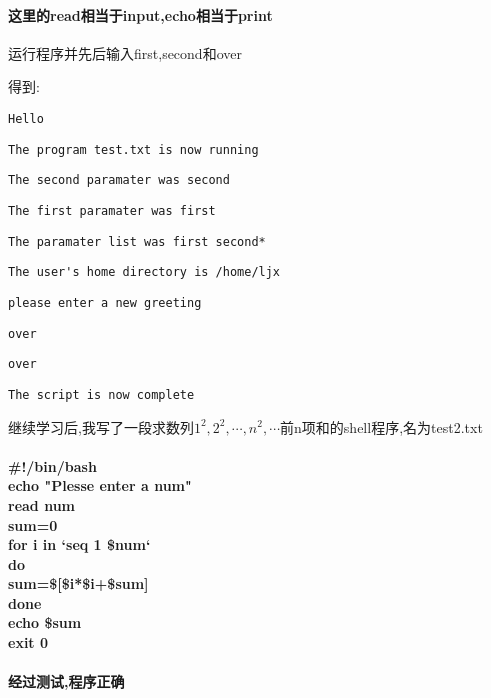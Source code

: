 \documentclass{ctexart}
\begin{document}
\paragraph{这里的read相当于input,echo相当于print}
运行程序并先后输入first,second和over\par
得到:\par
\verb|Hello|\par 
\verb|The program test.txt is now running|\par 
\verb|The second paramater was second|\par 
\verb|The first paramater was first|\par
\verb|The paramater list was first second*|\par 
\verb|The user's home directory is /home/ljx|\par 
\verb|please enter a new greeting|\par 
\verb|over|\par 
\verb|over|\par 
\verb|The script is now complete|\par
继续学习后,我写了一段求数列{$1^2,2^2,\cdots ,n^2,\cdots$}前n项和的shell程序,名为test2.txt
\paragraph{#!/bin/bash
\\echo "Plesse enter a num"
\\read num
\\sum=0
\\for i in `seq 1 \$num`
\\do
\\        sum=\$[\$i*\$i+\$sum]
\\done
\\echo \$sum
\\exit 0}
\paragraph{经过测试,程序正确}
\end{document}
